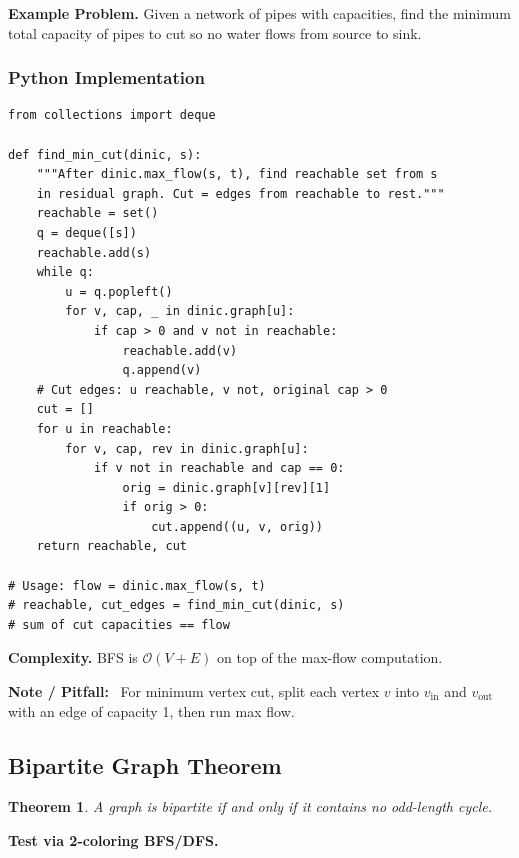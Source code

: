 \documentclass[10pt,a4paper]{article}
\theoremstyle{cpstyle}
\newtheorem{theorem}{Theorem}[section]
\newenvironment{cpnote}{%
  \begin{mdframed}[backgroundcolor=notebg, linecolor=orange!70, linewidth=1pt,
    innerleftmargin=10pt, innerrightmargin=10pt, innertopmargin=6pt, innerbottommargin=6pt]
  \textbf{\color{orange!80!black}Note / Pitfall:}~}{%
  \end{mdframed}}
\newcommand{\bigO}[1]{\mathcal{O}\!\left(#1\right)}
\begin{document}
\textbf{Example Problem.} Given a network of pipes with capacities, find the minimum total capacity of pipes to cut so no water flows from source to sink.

\subsubsection{Python Implementation}
\begin{lstlisting}[caption={Minimum Cut -- extract cut edges after max flow}]
from collections import deque

def find_min_cut(dinic, s):
    """After dinic.max_flow(s, t), find reachable set from s
    in residual graph. Cut = edges from reachable to rest."""
    reachable = set()
    q = deque([s])
    reachable.add(s)
    while q:
        u = q.popleft()
        for v, cap, _ in dinic.graph[u]:
            if cap > 0 and v not in reachable:
                reachable.add(v)
                q.append(v)
    # Cut edges: u reachable, v not, original cap > 0
    cut = []
    for u in reachable:
        for v, cap, rev in dinic.graph[u]:
            if v not in reachable and cap == 0:
                orig = dinic.graph[v][rev][1]
                if orig > 0:
                    cut.append((u, v, orig))
    return reachable, cut

# Usage: flow = dinic.max_flow(s, t)
# reachable, cut_edges = find_min_cut(dinic, s)
# sum of cut capacities == flow
\end{lstlisting}

\textbf{Complexity.} BFS is $\bigO{V+E}$ on top of the max-flow computation.

\begin{cpnote}
For minimum vertex cut, split each vertex $v$ into $v_{\text{in}}$ and $v_{\text{out}}$ with an edge of capacity 1, then run max flow.
\end{cpnote}

\subsection{Bipartite Graph Theorem}

\begin{theorem}
A graph is bipartite if and only if it contains no odd-length cycle.
\end{theorem}

\textbf{Test via 2-coloring BFS/DFS.}
\end{document}

